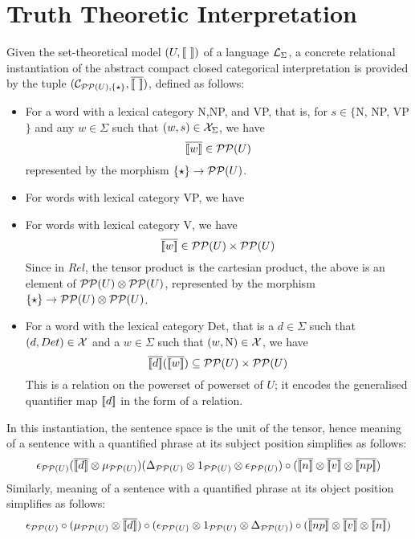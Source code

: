 \section{Truth Theoretic Interpretation}

Given the set-theoretical model $(U, [\![ \  ]\!])$ of a language ${\cal L}_{\Sigma}$, a concrete relational instantiation of the abstract compact closed categorical interpretation is  provided by the tuple $({\cal C}_{{\cal P}{\cal P}(U), \{\star\}}, \overline{[\![ \  ]\!]})$, defined as follows: 
\begin{itemize}
\item For a word with a lexical category N,NP, and VP, that is,  for $s \in \{$N, NP, VP$\}$ and any  $w \in \Sigma$ such that  $(w,s) \in {\cal X}_{\Sigma}$,  we have  
\[
\overline{[\![ w ]\!]} \in {\cal P}{\cal P}(U)
\]
represented by the morphism $\{\star\} \to {\cal P}{\cal P}(U)$. 
\item For words with lexical category VP, we have
\item For words with lexical category V, we have
\[
\overline{[\![ w ]\!]} \in   {\cal P}{\cal P}(U) \times  {\cal P}{\cal P}(U) 
\]
Since in $Rel$, the tensor product is the cartesian product, the above is an element of ${\cal P}{\cal P}(U) \otimes {\cal P}{\cal P}(U)$, represented by the morphism $\{\star\} \to {\cal P}{\cal P}(U) \otimes {\cal P}{\cal P}(U)$. 

\item For a word with the lexical category Det, that is a $d \in \Sigma$ such that $(d, Det) \in {\cal X}$ and a $w \in \Sigma$ such that $(w, \text{N}) \in {\cal X}$, we have 
\[
\overline{[\![ d ]\!]}  (\overline{[\![ w ]\!]}) \subseteq {\cal P}{\cal P}(U) \times {\cal P}{\cal P}(U)
\]
This is a relation on the powerset of powerset of $U$; it encodes the generalised quantifier map $[\![ d ]\!]$ in the form of a relation.  
\end{itemize}

In this instantiation,   the sentence space is the unit of the tensor,   hence meaning of a sentence with a quantified phrase at its subject position simplifies as follows:
\[
\epsilon_{{\cal P}{\cal P}(U)}(\overline{\semantics{d}} \otimes  \mu_{{\cal P}{\cal P}(U)})(\Delta_{{\cal P}{\cal P}(U)} \otimes 1_{{{\cal P}{\cal P}(U)}} \otimes \epsilon_{{\cal P}{\cal P}(U)}) \circ
(\overline{\semantics{n}} \otimes \overline{\semantics{{v}}} \otimes \overline{\semantics{np}})
\]
Similarly, meaning of a sentence with a quantified phrase at its object position simplifies as follows:
\[
\epsilon_{{\cal P}{\cal P}(U)} \circ (\mu_{{\cal P}{\cal P}(U)} \otimes \overline{\semantics{d}}) \circ (\epsilon_{{\cal P}{\cal P}(U)} \otimes 1_{{{\cal P}{\cal P}(U)}} \otimes \Delta_{{\cal P}{\cal P}(U)}) \circ (\overline{\semantics{np}} \otimes \overline{\semantics{v}} \otimes \overline{\semantics{n}})
\]


